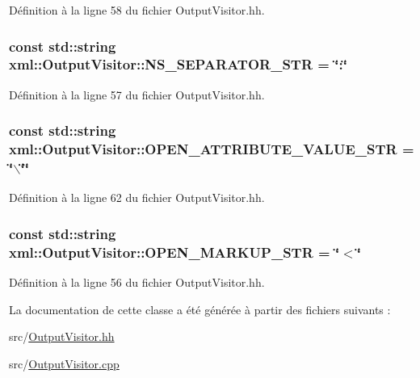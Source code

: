 Définition à la ligne 58 du fichier OutputVisitor.hh.

\hypertarget{classxml_1_1_output_visitor_a892952bcc6a8b9265c0934cfdc95dd65}{
\subsubsection[{NS\_\-SEPARATOR\_\-STR}]{\setlength{\rightskip}{0pt plus 5cm}const std::string {\bf xml::OutputVisitor::NS\_\-SEPARATOR\_\-STR} = \char`\"{}:\char`\"{}}}
\label{classxml_1_1_output_visitor_a892952bcc6a8b9265c0934cfdc95dd65}


Définition à la ligne 57 du fichier OutputVisitor.hh.

\hypertarget{classxml_1_1_output_visitor_a16ae3df2d90ed3e57ea51277de609988}{
\subsubsection[{OPEN\_\-ATTRIBUTE\_\-VALUE\_\-STR}]{\setlength{\rightskip}{0pt plus 5cm}const std::string {\bf xml::OutputVisitor::OPEN\_\-ATTRIBUTE\_\-VALUE\_\-STR} = \char`\"{}$\backslash$\char`\"{}\char`\"{}}}
\label{classxml_1_1_output_visitor_a16ae3df2d90ed3e57ea51277de609988}


Définition à la ligne 62 du fichier OutputVisitor.hh.

\hypertarget{classxml_1_1_output_visitor_a3a2a1c7860151f173fd28c0077ffd94a}{
\subsubsection[{OPEN\_\-MARKUP\_\-STR}]{\setlength{\rightskip}{0pt plus 5cm}const std::string {\bf xml::OutputVisitor::OPEN\_\-MARKUP\_\-STR} = \char`\"{}$<$\char`\"{}}}
\label{classxml_1_1_output_visitor_a3a2a1c7860151f173fd28c0077ffd94a}


Définition à la ligne 56 du fichier OutputVisitor.hh.



La documentation de cette classe a été générée à partir des fichiers suivants :\begin{DoxyCompactItemize}
\item 
src/\hyperlink{_output_visitor_8hh}{OutputVisitor.hh}\item 
src/\hyperlink{_output_visitor_8cpp}{OutputVisitor.cpp}\end{DoxyCompactItemize}
